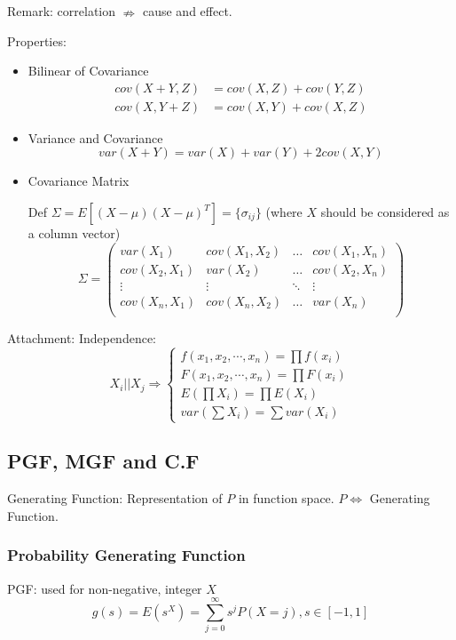     Remark: correlation $\nRightarrow$ cause and effect.

    Properties:
\begin{itemize}
\item Bilinear of Covariance\begin{align*}
    cov(X+Y,Z)&=cov(X,Z)+cov(Y,Z)\\
    cov(X,Y+Z)&=cov(X,Y)+cov(X,Z)
\end{align*}
    
\item Variance and Covariance\begin{equation}\label{EqaVarOfSumOfRV}
    var(X+Y)=var(X)+var(Y)+2cov(X,Y)
\end{equation}
\item Covariance Matrix

    Def $\Sigma=E[(X-\mu)(X-\mu)^T]=\{\sigma_{ij}\}$ (where $X$ should be considered as a column vector)
\begin{equation}\label{covariancematrix}
    \Sigma=
        \begin{pmatrix}
        var(X_1) & cov(X_1,X_2) & \ldots & cov(X_1,X_n)\\
        cov(X_2,X_1) & var(X_2) & \ldots & cov(X_2,X_n)\\
        \vdots & \vdots & \ddots & \vdots\\
        cov(X_n,X_1) & cov(X_n,X_2) & \ldots & var(X_n)\\
        \end{pmatrix}    
    \end{equation}
\end{itemize}

Attachment: Independence:\[
    X_i || X_j\Rightarrow \begin{cases}
        f(x_1,x_2,\cdots,x_n)=\prod f(x_i)\\
        F(x_1,x_2,\cdots,x_n)=\prod F(x_i)\\
        E(\prod X_i)=\prod E(X_i)\\
        var(\sum X_i)=\sum var(X_i)
    \end{cases}
\]


\subsection{PGF, MGF and C.F}\label{SectionPGFMGFCF}

    Generating Function: Representation of $P$ in function space. $P\Leftrightarrow$ Generating Function.

\subsubsection{Probability Generating Function}
    PGF: used for non-negative, integer $X$
    \[
        g(s)=E(s^X)=\sum_{j=0}^\infty s^jP(X=j)    ,s\in[-1,1]
    \]

